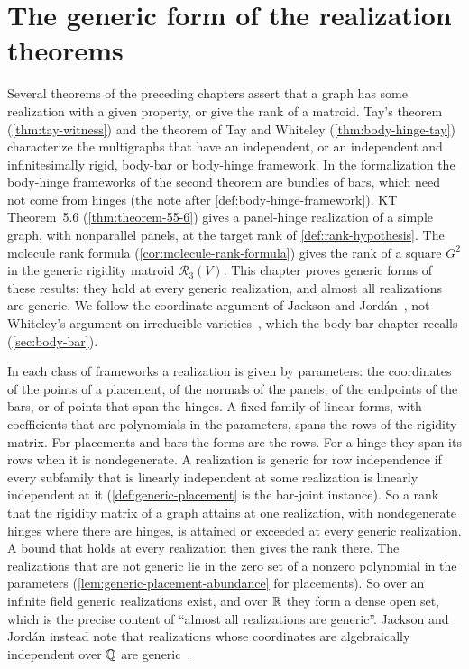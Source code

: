 \section{The generic form of the realization theorems}
\label{sec:generic-lift}

Several theorems of the preceding chapters assert that a graph has
some realization with a given property, or give the rank of a matroid.
Tay's theorem (\cref{thm:tay-witness}) and the theorem of Tay and
Whiteley (\cref{thm:body-hinge-tay}) characterize the multigraphs that
have an independent, or an independent and infinitesimally rigid,
body-bar or body-hinge framework. In the formalization the body-hinge
frameworks of the second theorem are bundles of bars, which need not
come from hinges (the note after \cref{def:body-hinge-framework}). KT
Theorem~5.6 (\cref{thm:theorem-55-6}) gives a panel-hinge realization
of a simple graph, with nonparallel panels, at the target rank of
\cref{def:rank-hypothesis}. The molecule rank formula
(\cref{cor:molecule-rank-formula}) gives the rank of a square $G^2$ in
the generic rigidity matroid $\mathcal{R}_3(V)$. This chapter proves
generic forms of these results: they hold at every generic
realization, and almost all realizations are generic. We follow the
coordinate argument of Jackson and Jord\'an~\cite{jacksonJordan2009},
not Whiteley's argument on irreducible
varieties~\cite[\S3.1]{whiteley1988}, which the body-bar chapter
recalls (\cref{sec:body-bar}).

In each class of frameworks a realization is given by parameters: the
coordinates of the points of a placement, of the normals of the
panels, of the endpoints of the bars, or of points that span the
hinges. A fixed family of linear forms, with coefficients that are
polynomials in the parameters, spans the rows of the rigidity matrix.
For placements and bars the forms are the rows. For a hinge they span
its rows when it is nondegenerate. A realization is generic for row
independence if every subfamily that is linearly independent at some
realization is linearly independent at it (\cref{def:generic-placement}
is the bar-joint instance). So a rank that the rigidity matrix of a
graph attains at one realization, with nondegenerate hinges where there
are hinges, is attained or exceeded at every generic realization. A
bound that holds at every realization then gives the rank there. The
realizations that are not generic lie in the zero set of a nonzero
polynomial in the parameters (\cref{lem:generic-placement-abundance}
for placements). So over an infinite field generic realizations exist,
and over ${\mathbb{R}}$ they form a dense open set, which is the precise content
of ``almost all realizations are generic''. Jackson and Jord\'an
instead note that realizations whose coordinates are algebraically
independent over ${\mathbb{Q}}$ are generic~\cite[\S5]{jacksonJordan2009}.

